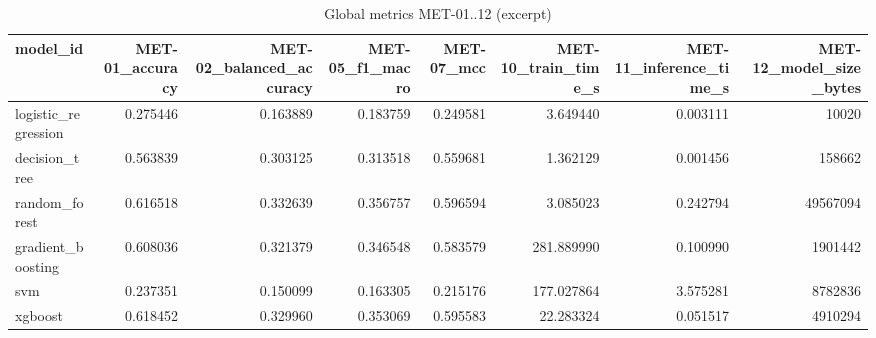 \begin{table}
\caption{Global metrics MET-01..12 (excerpt)}
\label{tab:A6_exp-a4-v2__03_global_metrics}
\begin{tabular}{lrrrrrrr}
\toprule
model\_id & MET-01\_accuracy & MET-02\_balanced\_accuracy & MET-05\_f1\_macro & MET-07\_mcc & MET-10\_train\_time\_s & MET-11\_inference\_time\_s & MET-12\_model\_size\_bytes \\
\midrule
logistic\_regression & 0.275446 & 0.163889 & 0.183759 & 0.249581 & 3.649440 & 0.003111 & 10020 \\
decision\_tree & 0.563839 & 0.303125 & 0.313518 & 0.559681 & 1.362129 & 0.001456 & 158662 \\
random\_forest & 0.616518 & 0.332639 & 0.356757 & 0.596594 & 3.085023 & 0.242794 & 49567094 \\
gradient\_boosting & 0.608036 & 0.321379 & 0.346548 & 0.583579 & 281.889990 & 0.100990 & 1901442 \\
svm & 0.237351 & 0.150099 & 0.163305 & 0.215176 & 177.027864 & 3.575281 & 8782836 \\
xgboost & 0.618452 & 0.329960 & 0.353069 & 0.595583 & 22.283324 & 0.051517 & 4910294 \\
\bottomrule
\end{tabular}
\end{table}
